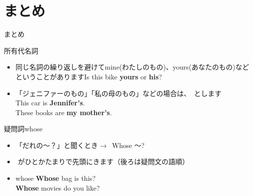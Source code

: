 \documentclass[aspectratio=169,xcolor={dvipsnames,table}]{beamer}
\begin{document}
\section{まとめ}
\begin{frame}[plain]{まとめ}
 \begin{exampleblock}{所有代名詞}
\begin{itemize}[square]\small
 \item 同じ名詞の繰り返しを避けてmine(わたしのもの)、yours(あなたのもの)などということがあります\hfill{\scriptsize Is this bike {\bfseries yours} or {\bfseries his}?}
 \item 「ジェニファーのもの」「私の母のもの」などの場合は、
\,とします\\
\hfill{\scriptsize This car is {\bfseries Jennifer's}.}\\
\hfill{\scriptsize These books are {\bfseries my mother's}.}
\end{itemize}
     \end{exampleblock}

\begin{exampleblock}{疑問詞whose }
\begin{itemize}[square]\small
 \item 「だれの～？」と聞くとき$\longrightarrow$\,\,\,Whose 〜?
 \item  {}\,\,がひとかたまりで先頭にきます（後ろは疑問文の語順）
 \item whose \hfill{\scriptsize {\bfseries Whose} bag is this?}\\\hfill{\scriptsize {\bfseries Whose} movies do you like?}
\end{itemize}
     \end{exampleblock}
\hfill{\scriptsize {}}

\end{frame}
\end{document}
